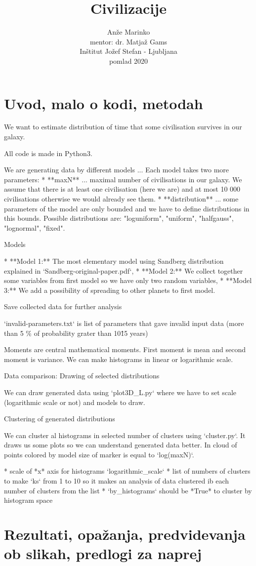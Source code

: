 \documentclass[a4paper]{IEEEtran}
\title{Civilizacije}
\author{Anže Marinko \\ mentor: dr. Matjaž Gams \\ Inštitut Jožef Stefan - Ljubljana \\ pomlad 2020}
\begin{document}
\maketitle

\section{Uvod, malo o kodi, metodah}
We want to estimate distribution of time that some civilisation
survives in our galaxy.

All code is made in Python3.

We are generating data by different models ... Each model takes two more parameters:
* **maxN** ... maximal number of civilisations in our galaxy. We assume
that there is at least one civilisation (here we are) and at most 10 000
civilisations otherwise we would already see them.
* **distribution** ... some parameters of the model are only bounded
and we have to define distributions in this bounds. Possible distributions are:
"loguniform", "uniform", "halfgauss", "lognormal", "fixed".

Models

* **Model 1:** The most elementary model using Sandberg distribution explained
in `Sandberg-original-paper.pdf`,
* **Model 2:** We collect together some variables from first model so
we have only two random variables,
* **Model 3:** We add a possibility of spreading to other
planets to first model.

Save collected data for further analysis

`invalid-parameters.txt` is list of parameters that gave invalid input data
(more than 5 \% of probability grater than 10\^15 years)

Moments are central mathematical moments. First moment is mean and
second moment is variance. We can make histograms in linear or
logarithmic scale.

Data comparison: Drawing of selected distributions

We can draw generated data using `plot3D\_L.py` where
we have to set scale (logarithmic scale or not) and models
to draw.

Clustering of generated distributions

We can cluster al histograms in selected number of clusters
using `cluster.py`. It draws us some plots so we can understand
generated data better. In cloud of points colored by model
size of marker is equal to `log(maxN)`.

* scale of *x* axis for histograms `logarithmic\_scale`
* list of numbers of clusters to make `ks` from 1 to 10 so it
makes an analysis of data clustered ib each number of clusters
from the list
* `by\_histograms` should be *True* to cluster by histogram
space

\section{Rezultati, opažanja, predvidevanja ob slikah, predlogi za naprej}
\end{document}
